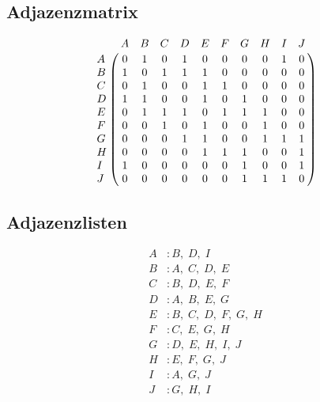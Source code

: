 \documentclass[a4paper, 12pt, margins=3cm]{homework}
\begin{document}
  \begin{problem}
    
  \end{problem}
  \begin{solution}
    
  \end{solution}


  \begin{problem}
    
  \end{problem}
  \begin{solution}
    
  \end{solution}


  \begin{problem}
    
  \end{problem}
  \begin{solution}\hfill 
    \subsection*{Adjazenzmatrix}
    \[ 
      \bordermatrix {
        ~ & A & B & C & D & E & F & G & H & I & J \cr
        A & 0 & 1 & 0 & 1 & 0 & 0 & 0 & 0 & 1 & 0 \cr
        B & 1 & 0 & 1 & 1 & 1 & 0 & 0 & 0 & 0 & 0 \cr
        C & 0 & 1 & 0 & 0 & 1 & 1 & 0 & 0 & 0 & 0 \cr
        D & 1 & 1 & 0 & 0 & 1 & 0 & 1 & 0 & 0 & 0 \cr
        E & 0 & 1 & 1 & 1 & 0 & 1 & 1 & 1 & 0 & 0 \cr
        F & 0 & 0 & 1 & 0 & 1 & 0 & 0 & 1 & 0 & 0 \cr
        G & 0 & 0 & 0 & 1 & 1 & 0 & 0 & 1 & 1 & 1 \cr
        H & 0 & 0 & 0 & 0 & 1 & 1 & 1 & 0 & 0 & 1 \cr
        I & 1 & 0 & 0 & 0 & 0 & 0 & 1 & 0 & 0 & 1 \cr
        J & 0 & 0 & 0 & 0 & 0 & 0 & 1 & 1 & 1 & 0
      } 
    \]

    \subsection*{Adjazenzlisten}
    \begin{align*}
      A & : B,\; D,\; I \\
      B & : A,\; C,\; D,\; E \\
      C & : B,\; D,\; E,\; F \\
      D & : A,\; B,\; E,\; G \\
      E & : B,\; C,\; D,\; F,\; G,\; H \\
      F & : C,\; E,\; G,\; H \\
      G & : D,\; E,\; H,\; I,\; J \\
      H & : E,\; F,\; G,\; J \\
      I & : A,\; G,\; J \\
      J & : G,\; H,\; I
    \end{align*}
  \end{solution}
\end{document}
